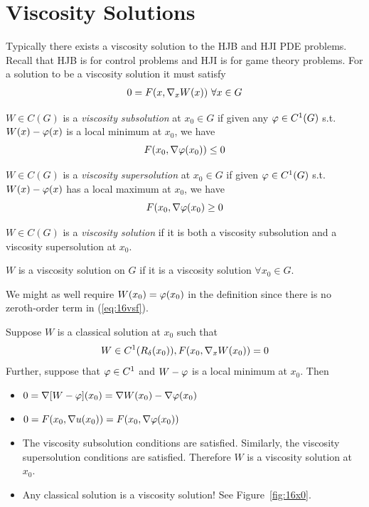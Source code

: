 \section{Viscosity Solutions}
Typically there exists a viscosity solution to the HJB and HJI PDE problems.
Recall that HJB is for control problems and HJI is for game theory problems.
For a solution to be a viscosity solution it must satisfy
\begin{align}
\label{eq:16vsf}
0 = F(x,\nabla_xW(x))~\forall x\in G
\end{align}

\begin{definition}
$W\in C(G)$ is a \textit{viscosity subsolution} at $x_0\in G$ if given any $\varphi\in C^1(G)$ s.t. $W(x)-\varphi(x)$ is a local minimum at $x_0$, we have
$$F(x_0,\nabla\varphi(x_0))\leq0$$
\end{definition}

\begin{definition}
$W\in C(G)$ is a \textit{viscosity supersolution} at $x_0\in G$ if given $\varphi\in C^1(G)$ s.t. $W(x)-\varphi(x)$ has a local maximum at $x_0$, we have
$$F(x_0,\nabla\varphi(x_0)\geq0$$
\end{definition}

\begin{definition}
$W\in C(G)$ is a \textit{viscosity solution} if it is both a viscosity subsolution and a viscosity supersolution at $x_0$.
\end{definition}

\begin{definition}
$W$ is a viscosity solution on $G$ if it is a viscosity solution $\forall x_0\in G$.
\end{definition}

\begin{remark}
We might as well require $W(x_0)=\varphi(x_0)$ in the definition since there is no zeroth-order term in (\ref{eq:16vsf}).
\end{remark}

\begin{remark}
Suppose $W$ is a classical solution at $x_0$ such that
$$W\in C^1(R_\delta(x_0)), F(x_0,\nabla_xW(x_0))=0$$
Further, suppose that $\varphi\in C^1$ and $W-\varphi$ is a local minimum at $x_0$.
Then
\begin{itemize}
\item $0 = \nabla[W-\varphi](x_0) = \nabla W(x_0)-\nabla\varphi(x_0)$
\item $0 = F(x_0,\nabla u(x_0)) = F(x_0,\nabla\varphi(x_0))$
\item The viscosity subsolution conditions are satisfied.
      Similarly, the viscosity supersolution conditions are satisfied.
      Therefore $W$ is a viscosity solution at $x_0$.
\item Any classical solution is a viscosity solution! See Figure~\ref{fig:16x0}.
\end{itemize}
\end{remark}

